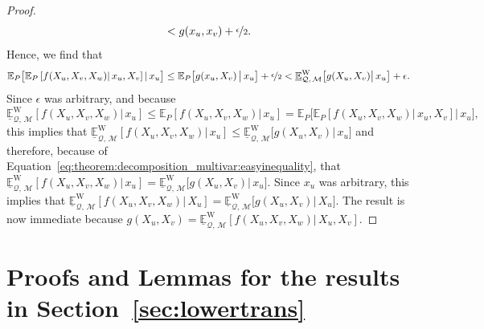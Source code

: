 \documentclass[10pt,a4paper]{paper}
\theoremstyle{definition}
\newcommand{\rateset}{\mathcal{Q}}
\begin{document}
\begin{proof}
\begin{equation*}
<g(x_u,x_v)+\nicefrac{\epsilon}{2}.\vspace{6pt}
\end{equation*}
Hence, we find that
\begin{align*}
\mathbb{E}_P\bigl[\mathbb{E}_P\left[f(X_u,X_v,X_w)\vert\,x_u,X_v\right]\vert\,x_u\bigr]
\leq
\mathbb{E}_P\bigl[g(x_u,X_v)\,\big\vert\,x_u\bigr]+\nicefrac{\epsilon}{2}
< \underline{\mathbb{E}}^{\mathrm{W}}_{\rateset,\,\mathcal{M}}\bigl[g(X_u,X_v)\big\vert\,x_u\bigr]
+\epsilon.
\end{align*}
Since $\epsilon$ was arbitrary, and because
\begin{equation*}
\underline{\mathbb{E}}^{\mathrm{W}}_{\rateset,\,\mathcal{M}}\left[f(X_u,X_v,X_w)\vert\,x_u\right]
\leq
\mathbb{E}_P\left[f(X_u,X_v,X_w)\vert\,x_u\right] = \mathbb{E}_P\bigl[\mathbb{E}_P\left[f(X_u,X_v,X_w)\vert\,x_u,X_v\right]\vert\,x_u\bigr],
\end{equation*}
this implies that
$\underline{\mathbb{E}}^{\mathrm{W}}_{\rateset,\,\mathcal{M}}\left[f(X_u,X_v,X_w)\vert\,x_u\right]\leq\underline{\mathbb{E}}^{\mathrm{W}}_{\rateset,\,\mathcal{M}}\bigl[g(X_u,X_v)\big\vert\,x_u\bigr]$ and therefore, because of Equation~\eqref{eq:theorem:decomposition_multivar:easyinequality}, that $\underline{\mathbb{E}}^{\mathrm{W}}_{\rateset,\,\mathcal{M}}\left[f(X_u,X_v,X_w)\vert\,x_u\right]=\underline{\mathbb{E}}^{\mathrm{W}}_{\rateset,\,\mathcal{M}}\bigl[g(X_u,X_v)\big\vert\,x_u\bigr]$. Since $x_u$ was arbitrary, this implies that $\underline{\mathbb{E}}^{\mathrm{W}}_{\rateset,\,\mathcal{M}}\left[f(X_u,X_v,X_w)\vert\,X_u\right]=\underline{\mathbb{E}}^{\mathrm{W}}_{\rateset,\,\mathcal{M}}\bigl[g(X_u,X_v)\big\vert\,X_u\bigr]$. The result is now immediate because $g(X_u,X_v)=\underline{\mathbb{E}}^{\mathrm{W}}_{\rateset,\,\mathcal{M}}\left[f(X_u,X_v,X_w)\vert\,X_u,X_v\right]$. 
\end{proof}



\section{Proofs and Lemmas for the results in Section~\ref{sec:lowertrans}}
\end{document}
